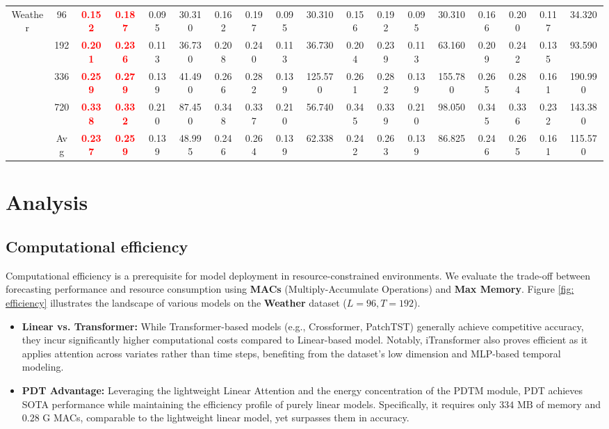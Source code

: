 \documentclass[final,3p,times]{elsarticle}
\newcommand{\best}[1]{\textbf{\textcolor{red}{#1}}}
\begin{document}
\begin{table}[!t]
{\begin{tabular}{c|c|cccc|cccc|cccc|cccc}
\multirow{5}{*}{Weather} 
& 96  & \best{0.152} & \best{0.187} & 0.095 & 30.310 & 0.162 & 0.197 & 0.095 & 30.310 & 0.156 & 0.192 & 0.095 & 30.310 & 0.166 & 0.200 & 0.117 & 34.320 \\
& 192 & \best{0.201} & \best{0.236} & 0.113 & 36.730 & 0.208 & 0.240 & 0.113 & 36.730 & 0.204 & 0.239 & 0.113 & 63.160 & 0.209 & 0.242 & 0.135 & 93.590 \\
& 336 & \best{0.259} & \best{0.279} & 0.139 & 41.490 & 0.266 & 0.282 & 0.139 & 125.570 & 0.261 & 0.282 & 0.139 & 155.780 & 0.265 & 0.284 & 0.161 & 190.990 \\
& 720 & \best{0.338} & \best{0.332} & 0.210 & 87.450 & 0.348 & 0.337 & 0.210 & 56.740 & 0.345 & 0.339 & 0.210 & 98.050 & 0.345 & 0.336 & 0.232 & 143.380 \\
& Avg & \best{0.237} & \best{0.259} & 0.139 & 48.995 & 0.246 & 0.264 & 0.139 & 62.338 & 0.242 & 0.263 & 0.139 & 86.825 & 0.246 & 0.265 & 0.161 & 115.570 \\
\bottomrule
\end{tabular}
}
\label{tab:abl_mcd} 
\end{table}

\section{Analysis}

\subsection{Computational efficiency}
Computational efficiency is a prerequisite for model deployment in resource-constrained environments. We evaluate the trade-off between forecasting performance and resource consumption using \textbf{MACs} (Multiply-Accumulate Operations) and \textbf{Max Memory}.
Figure \ref{fig: efficiency} illustrates the landscape of various models on the \textbf{Weather} dataset ($L=96, T=192$).
\begin{itemize}
    \item \textbf{Linear vs. Transformer:} While Transformer-based models (e.g., Crossformer, PatchTST) generally achieve competitive accuracy, they incur significantly higher computational costs compared to Linear-based model. Notably, iTransformer also proves efficient as it applies attention across variates rather than time steps, benefiting from the dataset's low dimension and MLP-based temporal modeling.
    \item \textbf{PDT Advantage:} Leveraging the lightweight Linear Attention and the energy concentration of the PDTM module, PDT achieves SOTA performance while maintaining the efficiency profile of purely linear models. Specifically, it requires only $334 \text{ MB}$ of memory and $0.28 \text{ G}$ MACs, comparable to the lightweight linear model, yet surpasses them in accuracy.
\end{itemize}
\end{document}

